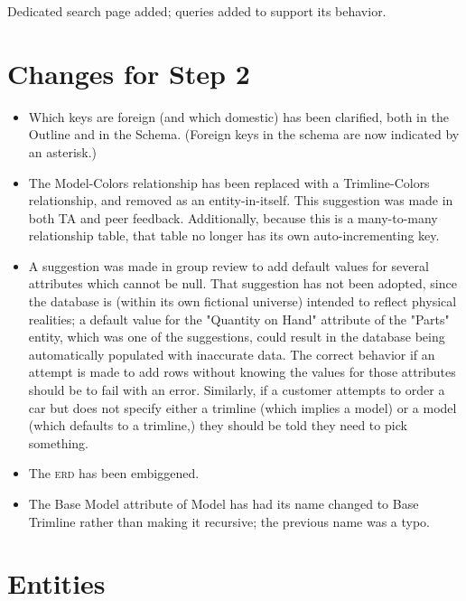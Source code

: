\documentclass[11pt,letterpaper,oneside]{amsart}
\begin{document}
Dedicated search page added; queries added to support its behavior.



\section*{Changes for Step 2}

\begin{itemize}

\item Which keys are foreign (and which domestic) has been clarified, both in the Outline and in the Schema.  (Foreign keys in the schema are now indicated by an asterisk.)

\item The Model-Colors relationship has been replaced with a Trimline-Colors relationship, and removed as an entity-in-itself.  This suggestion was made in both TA and peer feedback.  Additionally, because this is a many-to-many relationship table, that table no longer has its own auto-incrementing key.

\item A suggestion was made in group review to add default values for several attributes which cannot be null.  That suggestion has not been adopted, since the database is (within its own fictional universe) intended to reflect physical realities; a default value for the "Quantity on Hand" attribute of the "Parts" entity, which was one of the suggestions, could result in the database being automatically populated with inaccurate data.  The correct behavior if an attempt is made to add rows without knowing the values for those attributes should be to fail with an error.  Similarly, if a customer attempts to order a car but does not specify either a trimline (which implies a model) or a model (which defaults to a trimline,) they should be told they need to pick something.

\item The \textsc{erd} has been embiggened.

\item The Base Model attribute of Model has had its name changed to Base Trimline rather than making it recursive; the previous name was a typo.

\end{itemize}


\section*{Entities}
\end{document}
